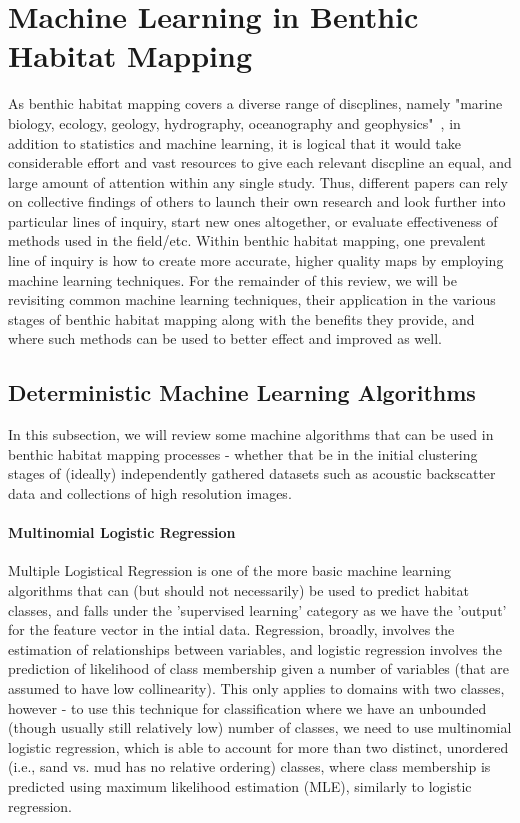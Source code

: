 \documentclass[12pt]{article}
\begin{document}
            \pagebreak

            \section{Machine Learning in Benthic Habitat Mapping}
            As benthic habitat mapping covers a diverse range of discplines, namely "marine biology, ecology, geology, hydrography, oceanography and geophysics"~\citep{cjbrown11}, in addition to statistics and machine learning, it is logical that it would take considerable effort and vast resources to give each relevant discpline an equal, and large amount of attention within any single study. Thus, different papers can rely on collective findings of others to launch their own research and look further into particular lines of inquiry, start new ones altogether, or evaluate effectiveness of methods used in the field/etc. Within benthic habitat mapping, one prevalent line of inquiry is how to create more accurate, higher quality maps by employing machine learning techniques. For the remainder of this review, we will be revisiting common machine learning techniques, their application in the various stages of benthic habitat mapping along with the benefits they provide, and where such methods can be used to better effect and improved as well.

            \subsection{Deterministic Machine Learning Algorithms}
            In this subsection, we will review some machine algorithms that can be used in benthic habitat mapping processes - whether that be in the initial clustering stages of (ideally) independently gathered datasets such as acoustic backscatter data and collections of high resolution images.

            \paragraph{Multinomial Logistic Regression}
            Multiple Logistical Regression is one of the more basic machine learning algorithms that can (but should not necessarily) be used to predict habitat classes, and falls under the 'supervised learning' category as we have the 'output' for the feature vector in the intial data. Regression, broadly, involves the estimation of relationships between variables, and logistic regression involves the prediction of likelihood of class membership given a number of variables (that are assumed to have low collinearity). This only applies to domains with two classes, however - to use this technique for classification where we have an unbounded (though usually still relatively low) number of classes, we need to use multinomial logistic regression, which is able to account for more than two distinct, unordered (i.e., sand vs. mud has no relative ordering) classes, where class membership is predicted using maximum likelihood estimation (MLE), similarly to logistic regression. 
            
\end{document}
